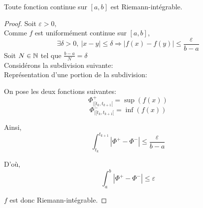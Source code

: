 \documentclass[../main.tex]{subfile}
\begin{document}
\begin{theo}
	Toute fonction continue sur $[a, b]$ est Riemann-intégrable.
\end{theo}

\begin{proof}
	Soit $\varepsilon > 0,$\\
	Comme $f$ est uniformément continue sur $[a, b]$, \\
	$$\exists \delta > 0, \ |x-y| \leq \delta \Rightarrow |f(x) - f(y)| \leq \frac{\varepsilon}{b-a}$$
	Soit $N \in \mathbb{N}$ tel que $\frac{b-a}{N} = \delta$\\
	Considérons la subdivision suivante:\\


	Représentation d'une portion de la subdivision:

	\begin{center}

	\def\svgwidth{0.5\textwidth}
	
	
	\end{center}

	On pose les deux fonctions suivantes:\\
	$$\Phi_{|[t_k, t_{k+1}[}^+ = \sup(f(x))$$
	$$\Phi_{|[t_k, t_{k+1}[}^- = \inf(f(x))$$

	Ainsi, \\
	$$\int_{t_k}^{t_{k+1}} |\Phi^+ - \Phi^-| \leq \frac{\varepsilon}{b-a}$$

	D'où, \\
	$$\int_{a}^{b} |\Phi^+ - \Phi^-| \leq \varepsilon$$

	$f$ est donc Riemann-intégrable.
\end{proof}
\end{document}
